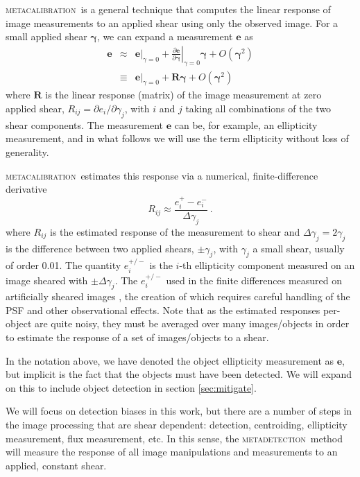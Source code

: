 \documentclass[fleqn,useAMS,usenatbib]{mnras}
\newcommand{\mcal}{\textsc{metacalibration}}
\newcommand{\mdet}{\textsc{metadetection}}
\begin{document}
\mcal\ is a general technique that computes the linear response of image
measurements to an applied shear using only the observed image.  For a small
applied shear $\boldsymbol{\gamma}$, we can expand a measurement $\boldsymbol{e}$ as
\begin{eqnarray}
\boldsymbol{e} & \approx & \left.\boldsymbol{e}\right|_{\gamma=0} +
                           \left.\frac{\partial \boldsymbol{e}}{\partial\boldsymbol\gamma}\right|_{\gamma=0} \boldsymbol\gamma +
                           O(\boldsymbol\gamma^2)\nonumber\\
               & \equiv  & \left.\boldsymbol{e}\right|_{\gamma=0} +
                           \boldsymbol{R} \boldsymbol\gamma +
                           O(\boldsymbol\gamma^2)
\end{eqnarray}
where $\boldsymbol{R}$ is the linear response (matrix) of the image measurement
at zero applied shear, $R_{ij}=\partial e_i /\partial \gamma_j$, with $i$ and
$j$ taking all combinations of the two shear components.  The measurement
$\boldsymbol{e}$ can be, for example,  an ellipticity measurement, and in what
follows we will use the term ellipticity without loss of generality.

\mcal\ estimates this response via a numerical, finite-difference derivative
\begin{displaymath}
R_{ij} \approx \frac{e_i^{+} - e_i^{-}}{\Delta\gamma_j}\ .
\end{displaymath}
where $R_{ij}$ is the estimated response of the measurement to shear and
$\Delta\gamma_j = 2 \gamma_j$ is the difference between two applied shears,
$\pm \gamma_j$, with $\gamma_j$ a small shear, usually of order 0.01. The
quantity $e_i^{+/-}$ is the $i$-th ellipticity component measured on an image
sheared with $\pm\Delta\gamma_j$.  The $e_i^{+/-}$ used in the finite
differences measured on artificially sheared images \citep{SheldonMcal2017},
the creation of which requires careful handling of the PSF and other
observational effects.  Note that as the estimated responses per-object are
quite noisy, they must be averaged over many images/objects in order to
estimate the response of a set of images/objects to a shear.

In the notation above, we have denoted the object ellipticity measurement as
$\boldsymbol{e}$, but implicit is the fact that the objects must have been
detected.  We will expand on this to include object detection in section
\ref{sec:mitigate}.

We will focus on detection biases in this work, but there are a number of steps
in the image processing that are shear dependent: detection, centroiding,
ellipticity measurement, flux measurement, etc.  In this sense, the \mdet\
method will measure the response of all image manipulations and measurements to
an applied, constant shear.
\end{document}
